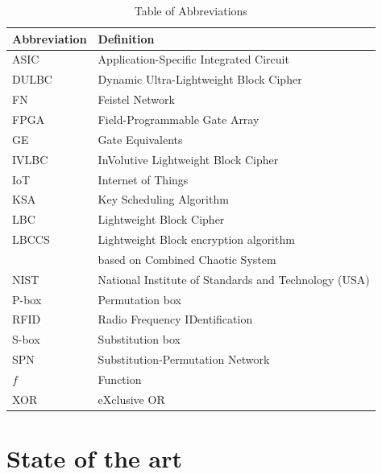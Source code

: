 \documentclass[conference]{IEEEtran}
\begin{document}
\begin{table}[ht]
    \centering
    \caption{Table of Abbreviations}
    \begin{tabular}{ll}
        \toprule
        \textbf{Abbreviation} & \textbf{Definition} \\
        \midrule
        ASIC & Application-Specific Integrated Circuit \\
        DULBC & Dynamic Ultra-Lightweight Block Cipher \\
        FN & Feistel Network \\
        FPGA & Field-Programmable Gate Array \\
        GE & Gate Equivalents \\
        IVLBC & InVolutive Lightweight Block Cipher \\
        IoT & Internet of Things \\
        KSA & Key Scheduling Algorithm \\
        LBC & Lightweight Block Cipher \\
        LBCCS & Lightweight Block encryption algorithm \\
        & based on Combined Chaotic System \\
        NIST & National Institute of Standards and Technology (USA) \\
        P-box & Permutation box \\
        RFID & Radio Frequency IDentification \\
        S-box & Substitution box \\
        SPN & Substitution-Permutation Network \\
        $f$ & Function \\
        XOR & eXclusive OR \\
        \bottomrule
    \end{tabular}
    \label{table:abbreviations}
\end{table}

\section{State of the art}
\end{document}
